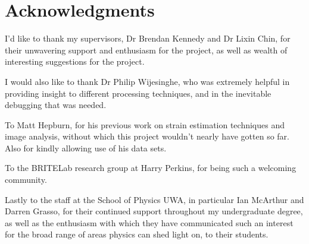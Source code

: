 \chapter*{Acknowledgments}
\thispagestyle{empty}

I'd like to thank my supervisors, Dr Brendan Kennedy and Dr Lixin Chin, for their unwavering support and enthusiasm for the project, as well as wealth of interesting suggestions for the project. 

I would also like to thank Dr Philip Wijesinghe, who was extremely helpful in providing insight to different processing techniques, and in the inevitable debugging that was needed. 

To Matt Hepburn, for his previous work on strain estimation techniques and image analysis, without which this project wouldn't nearly have gotten so far. Also for kindly allowing use of his data sets. 

To the BRITELab research group at Harry Perkins, for being such a welcoming community. 

Lastly to the staff at the School of Physics UWA, in particular Ian McArthur and Darren Grasso, for their continued support throughout my undergraduate degree, as well as the enthusiasm with which they have communicated such an interest for the broad range of areas physics can shed light on, to their students.
